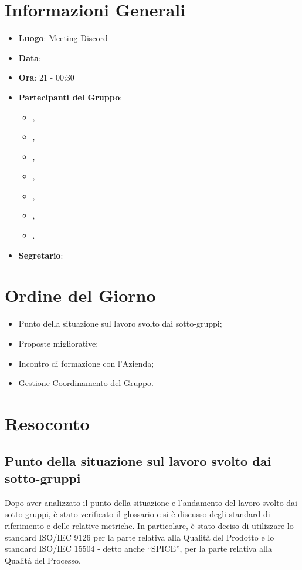 \section{Informazioni Generali}

\begin{itemize}
\item{\textbf{Luogo}}: Meeting Discord
\item{\textbf{Data}}: \D{}
\item{\textbf{Ora}}: 21 - 00:30
\item{\textbf{Partecipanti del Gruppo}}: 
	\begin{itemize}
	\item{\EP{},} 
	\item{\FP{},}
	\item{\GC{},}
	\item{\LW{},}
	\item{\MB{},}
	\item{\MG{},}
	\item{\PV{}.}
	\end{itemize} 
\item{\textbf{Segretario}}: \PV{}	
\end{itemize}

\section{Ordine del Giorno}
\begin{itemize}
\item{Punto della situazione sul lavoro svolto dai sotto-gruppi;}
\item{Proposte migliorative;}
\item{Incontro di formazione con l'Azienda;}
\item{Gestione Coordinamento del Gruppo.}
\end{itemize}

\section{Resoconto}

\subsection{Punto della situazione sul lavoro svolto dai sotto-gruppi}

Dopo aver analizzato il punto della situazione e l'andamento del lavoro svolto dai sotto-gruppi, è stato verificato il glossario e si è discusso degli standard di riferimento e delle relative metriche. In particolare, è stato deciso di utilizzare lo standard ISO/IEC 9126 per la parte relativa alla Qualità del Prodotto e lo standard ISO/IEC 15504 - detto anche “SPICE”, per la parte relativa alla Qualità del Processo.

